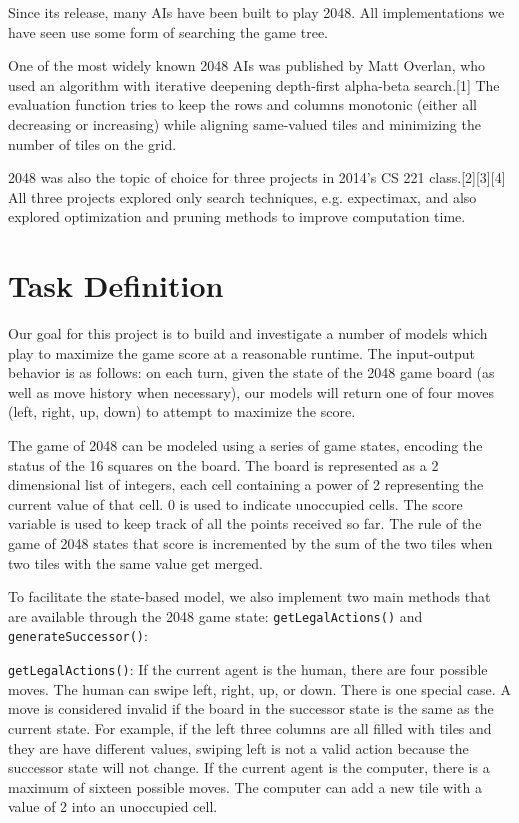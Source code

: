 \documentclass[9pt,twocolumn]{article}
\begin{document}
Since its release, many AIs have been built to play 2048. All implementations we have seen use some form of searching the game tree.

One of the most widely known 2048 AIs was published by Matt Overlan, who used an algorithm with iterative deepening depth-first alpha-beta search.[1] The evaluation function tries to keep the rows and columns monotonic (either all decreasing or increasing) while aligning same-valued tiles and minimizing the number of tiles on the grid.

2048 was also the topic of choice for three projects in 2014's CS 221 class.[2][3][4] All three projects explored only search techniques, e.g. expectimax, and also explored optimization and pruning methods to improve computation time.

\section{Task Definition}

Our goal for this project is to build and investigate a number of models which play to maximize the game score at a reasonable runtime. The input-output behavior is as follows: on each turn, given the state of the 2048 game board (as well as move history when necessary), our models will return one of four moves (left, right, up, down) to attempt to maximize the score.

The game of 2048 can be modeled using a series of game states, encoding the status of the 16 squares on the board. The board is represented as a 2 dimensional list of integers, each cell containing a power of 2 representing the current value of that cell. 0 is used to indicate unoccupied cells. The score variable is used to keep track of all the points received so far. The rule of the game of 2048 states that score is incremented by the sum of the two tiles when two tiles with the same value get merged.

To facilitate the state-based model, we also implement two main methods that are available through the 2048 game state: \texttt{getLegalActions()} and \texttt{generateSuccessor()}:

\texttt{getLegalActions()}: If the current agent is the human, there are four possible moves. The human can swipe left, right, up, or down. There is one special case. A move is considered invalid if the board in the successor state is the same as the current state. For example, if the left three columns are all filled with tiles and they are have different values, swiping left is not a valid action because the successor state will not change. If the current agent is the computer, there is a maximum of sixteen possible moves. The computer can add a new tile with a value of 2 into an unoccupied cell.
\end{document}
